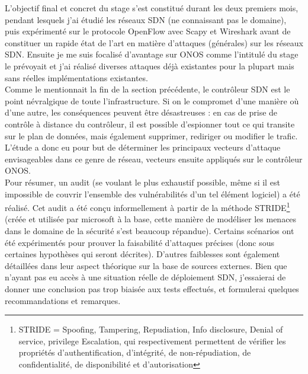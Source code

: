 L'objectif final et concret du stage s'est constitué durant les deux premiers mois, pendant lesquels j'ai étudié les réseaux SDN (ne connaissant pas le domaine), puis expérimenté sur le protocole OpenFlow avec Scapy et Wireshark avant de constituer un rapide état de l'art en matière d'attaques (générales) sur les réseaux SDN. Ensuite je me suis focalisé d'avantage sur ONOS comme l'intitulé du stage le prévoyait et j'ai réalisé diverses attaques déjà existantes pour la plupart mais sans réelles implémentations existantes.\\
Comme le mentionnait la fin de la section précédente, le contrôleur SDN est le point névralgique de toute l'infrastructure. Si on le compromet d'une manière où d'une autre, les conséquences peuvent être désastreuses : en cas de prise de contrôle à distance du contrôleur, il est possible d'espionner tout ce qui transite sur le plan de données, mais également supprimer, rediriger ou modifier le trafic. L'étude a donc eu pour but de déterminer les principaux vecteurs d'attaque envisageables dans ce genre de réseau, vecteurs ensuite appliqués sur le contrôleur ONOS.\\
Pour résumer, un audit (se voulant le plus exhaustif possible, même si il est impossible de couvrir l'ensemble des vulnérabilités d'un tel élément logiciel) a été réalisé. Cet audit a été conçu informellement à partir de la méthode STRIDE\footnote{STRIDE = Spoofing, Tampering, Repudiation, Info disclosure, Denial of service, privilege Escalation, qui respectivement permettent de vérifier les propriétés d'authentification, d'intégrité, de non-répudiation, de confidentialité, de disponibilité et d'autorisation} (créée et utilisée par microsoft à la base, cette manière de modéliser les menaces dans le domaine de la sécurité s’est beaucoup répandue). Certains scénarios ont été expérimentés pour prouver la faisabilité d'attaques précises (donc sous certaines hypothèses qui seront décrites). D'autres faiblesses sont également détaillées dans leur aspect théorique sur la base de sources externes. Bien que n'ayant pas eu accès à une situation réelle de déploiement SDN, j'essaierai de donner une conclusion pas trop biaisée aux tests effectués, et formulerai quelques recommandations et remarques.
